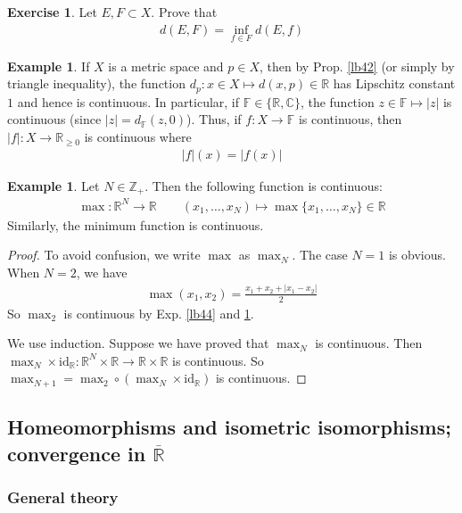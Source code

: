 \documentclass[12pt,b5paper,notitlepage]{article}
\theoremstyle{definition}
\newtheorem{eg}[df]{Example}
\newtheorem{exe}[df]{Exercise}
\theoremstyle{plain}
\newcommand{\ovl}{\overline}
\newcommand{\id}{\mathrm{id}}
\newcommand{\Cbb}{\mathbb C}
\newcommand{\Zbb}{\mathbb Z}
\newcommand{\Rbb}{\mathbb R}
\newcommand{\Fbb}{\mathbb F}
\numberwithin{equation}{section}
\begin{document}
\begin{exe}
Let $E,F\subset X$. Prove that
\begin{align}
d(E,F)=\inf_{f\in F}d(E,f)
\end{align}
\end{exe}

\begin{eg}\label{lb45}
If $X$ is a metric space and $p\in X$, then by Prop. \ref{lb42} (or simply by triangle inequality), the function $d_p:x\in X\mapsto d(x,p)\in\Rbb$ has Lipschitz constant $1$ and hence is continuous. In particular, if $\Fbb\in\{\Rbb,\Cbb\}$,  the function $z\in\Fbb\mapsto |z|$ is continuous (since $|z|=d_\Fbb(z,0)$). Thus, if $f:X\rightarrow\Fbb$ is continuous, then $|f|:X\rightarrow\Rbb_{\geq0}$ is continuous where
\begin{align}
|f|(x)=|f(x)|
\end{align}
\end{eg}


\begin{eg}
Let $N\in\Zbb_+$. Then the following function is continuous:
\begin{align*}
\max:\Rbb^N\rightarrow \Rbb\qquad (x_1,\dots,x_N)\mapsto\max\{x_1,\dots,x_N\}\in\Rbb
\end{align*}
Similarly, the minimum function is continuous.
\end{eg}

\begin{proof}
To avoid confusion, we write $\max$ as $\max_N$. The case $N=1$ is obvious. When $N=2$, we have
\begin{align}
\max(x_1,x_2)=\frac{x_1+x_2+|x_1-x_2|}2
\end{align}
So $\max_2$ is continuous by Exp. \ref{lb44} and \ref{lb45}.

We use induction. Suppose we have proved that $\max_N$ is continuous. Then $\max_N\times\id_\Rbb:\Rbb^N\times \Rbb\rightarrow\Rbb\times\Rbb$ is continuous. So $\max_{N+1}=\max_2\circ(\max_N\times\id_\Rbb)$ is continuous.
\end{proof}


\subsection{Homeomorphisms and isometric isomorphisms; convergence in $\ovl{\Rbb}$}

\subsubsection{General theory}
\end{document}
